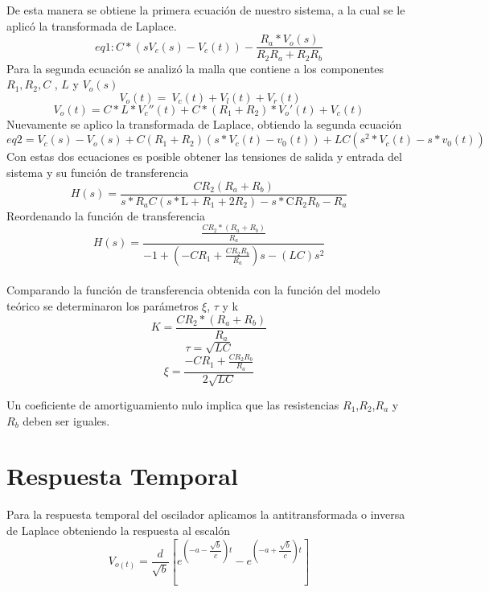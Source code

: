 \documentclass[10pt,a4paper]{article} %
\begin{document}
De esta manera se obtiene la primera ecuación de nuestro sistema, a la cual se le aplicó la transformada de Laplace. 
\begin{equation}
eq1:C* (s V_{c}(s)-V_{c}(t))-\frac{R_{a}* V_{o}(s)}{R_{2} R_{a} +R_{2} R_{b}}
\end{equation}
Para la segunda ecuación se analizó la malla que contiene a los componentes $R_{1},R_{2}, C$ , $L$ y $V_{o}(s)$ 
\begin{equation}
\ V_{o}(t)=\ V_{c}(t)+ V_{l}(t)+ V_{r}(t)
\end{equation}
\begin{equation}
V_{o}(t)=C*L*V_{c}''(t)+ C*(R_{1}+R_{2})*V_{o}'(t)+V_{c}(t)
\end{equation}
Nuevamente se aplico la transformada de Laplace, obtiendo la segunda ecuación
\begin{equation}
eq2 = V_{c}(s) - V_{o}(s) + C(R_{1} + R_{2})(s*V_{c}(t) - v_{0}(t)) + 
LC(s^{2}*V_{c}(t) - s*v_{0}(t))
\end{equation}
Con estas dos ecuaciones es posible obtener las tensiones de salida y entrada del sistema y su función de transferencia 
\begin{equation}
H(s)=\frac{C R_{2} (R_{a}+R_{b})}{s*R_{a}C (s*\text{L} +R_{1}+2 R_{2})-s*\text{C}R_{2} R_{b} -R_{a}}
\end{equation}
Reordenando la función de transferencia
\begin{equation}
H(s)=\frac{\frac{CR_{2}*(R_{a}+R_{b})}{R_{a}}}{-1+(-CR_{1}+\frac{CR_{2}R_{b}}{R_{a}})s-(LC)s^{2}}
\end{equation}
\\
Comparando la función de transferencia obtenida con la función del modelo teórico se determinaron los parámetros $\xi$, $\tau$ y k 
\begin{equation}
K=\frac{CR_{2}*(R_{a}+R_{b})}{R_{a}}
\end{equation}
\begin{equation}
\tau=\sqrt{LC}
\end{equation}
\begin{equation}
\xi=\dfrac{-CR_{1}+\frac{CR_{2}R_{b}}{R_{a}}}{2\sqrt{LC}}
\end{equation}

Un coeficiente de amortiguamiento nulo implica que las resistencias $R_1$,$R_2$,$R_a$ y $R_b$ deben ser iguales. 


\section{Respuesta Temporal}
Para la respuesta temporal del oscilador aplicamos la antitransformada o inversa de Laplace obteniendo la respuesta al escalón
\begin{equation}
    V_{o(t)}=\frac{d}{\sqrt{b}}\left[e^{\left(-a-\dfrac{\sqrt{b}}{c}\right)t}-e^{\left(-a+\dfrac{\sqrt{b}}{c}\right)t}\right]
\end{equation}
\end{document}
